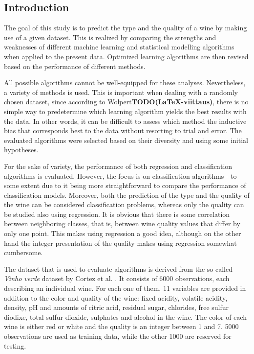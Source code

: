 \documentclass[twoside]{article}
\newcommand{\todo}[1]{\textbf{TODO(#1)}}
\begin{document}
\begin{multicols}{2} %

\section{Introduction}

The goal of this study is to predict the type and the quality of a wine by making use of a given dataset.
This is realized by comparing the strengths and weaknesses of different machine learning 
and statistical modelling algorithms when applied to the present data. Optimized learning algorithms
are then revised based on the performance of different methods.
 
All possible algorithms cannot be well-equipped for these analyses. Nevertheless,
a variety of methods is used. This is important when dealing with a randomly chosen dataset, since according to
Wolpert\todo{\LaTeX-viittaus}, there is no simple way to predetermine which
learning algorithm yields the best results with the data. In other words, it can be difficult to assess
which method the inductive bias that corresponds best to the data without resorting to trial and error.
The evaluated algorithms were selected based on their diversity and using some initial hypotheses.

For the sake of variety, the performance of both regression and classification algorithms is evaluated.
However, the focus is on classification algorithms - to some extent due to it being more straightforward to compare the 
performance of classification models. Moreover, both the prediction of the type and the quality of the wine can be considered
classification problems, whereas only the quality can be studied also using regression. It is obvious that
there is some correlation between neighboring classes, that is, between wine quality values that differ by only one point. This makes
using regression a good idea, although on the other hand the integer presentation of the quality makes using regression somewhat cumbersome.

The dataset that is used to evaluate algorithms is derived from the so called \emph{Vinho verde} dataset by Cortez et al. \cite{CorCer09}.
It consists of 6000 observations, each describing an individual wine. For each one of them, 11 variables are provided in addition
to the color and quality of the wine: fixed acidity, volatile acidity, density, pH and amounts of citric acid, residual sugar, chlorides, 
free sulfur diodixe, total sulfur dioxide, sulphates and alcohol in the wine. The color of each wine is either red or white 
and the quality is an integer between 1 and 7. 5000 observations are used as training data, while the other 1000 are reserved for testing.


\end{multicols}
\end{document}
